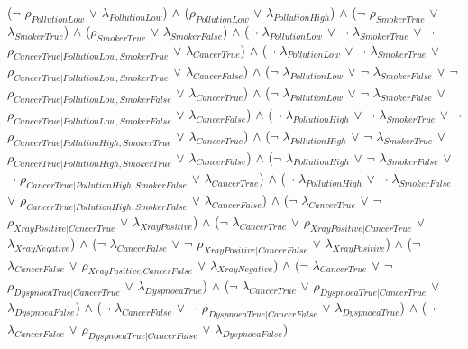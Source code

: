 \begin{center}
($\neg$ $\rho_{PollutionLow}$ $\lor$ $\lambda_{PollutionLow}$) $\land$ 
 ($\rho_{PollutionLow}$ $\lor$ $\lambda_{PollutionHigh}$) $\land$ 
 ($\neg$ $\rho_{SmokerTrue}$ $\lor$ $\lambda_{SmokerTrue}$) $\land$ 
 ($\rho_{SmokerTrue}$ $\lor$ $\lambda_{SmokerFalse}$) $\land$ 
 ($\neg$ $\lambda_{PollutionLow}$ $\lor$ $\neg$ $\lambda_{SmokerTrue}$ $\lor$ $\neg$ $\rho_{CancerTrue|PollutionLow,SmokerTrue}$ $\lor$ $\lambda_{CancerTrue}$) $\land$ 
 ($\neg$ $\lambda_{PollutionLow}$ $\lor$ $\neg$ $\lambda_{SmokerTrue}$ $\lor$ $\rho_{CancerTrue|PollutionLow,SmokerTrue}$ $\lor$ $\lambda_{CancerFalse}$) $\land$ 
 ($\neg$ $\lambda_{PollutionLow}$ $\lor$ $\neg$ $\lambda_{SmokerFalse}$ $\lor$ $\neg$ $\rho_{CancerTrue|PollutionLow,SmokerFalse}$ $\lor$ $\lambda_{CancerTrue}$) $\land$ 
 ($\neg$ $\lambda_{PollutionLow}$ $\lor$ $\neg$ $\lambda_{SmokerFalse}$ $\lor$ $\rho_{CancerTrue|PollutionLow,SmokerFalse}$ $\lor$ $\lambda_{CancerFalse}$) $\land$ 
 ($\neg$ $\lambda_{PollutionHigh}$ $\lor$ $\neg$ $\lambda_{SmokerTrue}$ $\lor$ $\neg$ $\rho_{CancerTrue|PollutionHigh,SmokerTrue}$ $\lor$ $\lambda_{CancerTrue}$) $\land$ 
 ($\neg$ $\lambda_{PollutionHigh}$ $\lor$ $\neg$ $\lambda_{SmokerTrue}$ $\lor$ $\rho_{CancerTrue|PollutionHigh,SmokerTrue}$ $\lor$ $\lambda_{CancerFalse}$) $\land$ 
 ($\neg$ $\lambda_{PollutionHigh}$ $\lor$ $\neg$ $\lambda_{SmokerFalse}$ $\lor$ $\neg$ $\rho_{CancerTrue|PollutionHigh,SmokerFalse}$ $\lor$ $\lambda_{CancerTrue}$) $\land$ 
 ($\neg$ $\lambda_{PollutionHigh}$ $\lor$ $\neg$ $\lambda_{SmokerFalse}$ $\lor$ $\rho_{CancerTrue|PollutionHigh,SmokerFalse}$ $\lor$ $\lambda_{CancerFalse}$) $\land$ 
 ($\neg$ $\lambda_{CancerTrue}$ $\lor$ $\neg$ $\rho_{XrayPositive|CancerTrue}$ $\lor$ $\lambda_{XrayPositive}$) $\land$ 
 ($\neg$ $\lambda_{CancerTrue}$ $\lor$ $\rho_{XrayPositive|CancerTrue}$ $\lor$ $\lambda_{XrayNegative}$) $\land$ 
 ($\neg$ $\lambda_{CancerFalse}$ $\lor$ $\neg$ $\rho_{XrayPositive|CancerFalse}$ $\lor$ $\lambda_{XrayPositive}$) $\land$ 
 ($\neg$ $\lambda_{CancerFalse}$ $\lor$ $\rho_{XrayPositive|CancerFalse}$ $\lor$ $\lambda_{XrayNegative}$) $\land$ 
 ($\neg$ $\lambda_{CancerTrue}$ $\lor$ $\neg$ $\rho_{DyspnoeaTrue|CancerTrue}$ $\lor$ $\lambda_{DyspnoeaTrue}$) $\land$ 
 ($\neg$ $\lambda_{CancerTrue}$ $\lor$ $\rho_{DyspnoeaTrue|CancerTrue}$ $\lor$ $\lambda_{DyspnoeaFalse}$) $\land$ 
 ($\neg$ $\lambda_{CancerFalse}$ $\lor$ $\neg$ $\rho_{DyspnoeaTrue|CancerFalse}$ $\lor$ $\lambda_{DyspnoeaTrue}$) $\land$ 
 ($\neg$ $\lambda_{CancerFalse}$ $\lor$ $\rho_{DyspnoeaTrue|CancerFalse}$ $\lor$ $\lambda_{DyspnoeaFalse}$)
\end{center}
